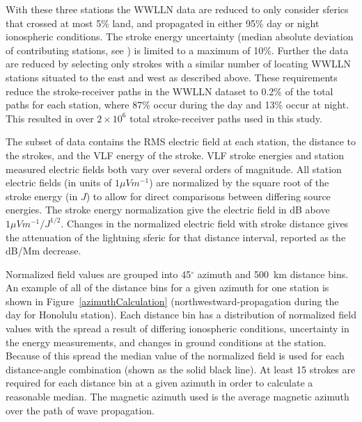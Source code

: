 With these three stations the WWLLN data are reduced to only consider sferics that crossed at most 5\% land, and propagated in either 95\% day or night ionospheric conditions.
The stroke energy uncertainty (median absolute deviation of contributing stations, see \citet{Hutchins2012}) is limited to a maximum of 10\%.
Further the data are reduced by selecting only strokes with a similar number of locating WWLLN stations situated to the east and west as described above.
These requirements reduce the stroke-receiver paths in the WWLLN dataset to 0.2\% of the total paths for each station, where 87\% occur during the day and 13\% occur at night.
This resulted in over $2\times10^6$ total stroke-receiver paths used in this study.

The subset of data contains the RMS electric field at each station, the distance to the strokes, and the VLF energy of the stroke.
VLF stroke energies and station measured electric fields both vary over several orders of magnitude.
All station electric fields (in units of $1 \mu V m^{-1}$) are normalized by the square root of the stroke energy (in $J$) to allow for direct comparisons between differing source energies.
The stroke energy normalization give the electric field in dB above $1 \mu Vm^{-1}/J^{1/2}$.
Changes in the normalized electric field with stroke distance gives the attenuation of the lightning sferic for that distance interval, reported as the dB/Mm decrease. 

Normalized field values are grouped into 45$^\circ$ azimuth and 500~km distance bins.
An example of all of the distance bins for a given azimuth for one station is shown in Figure~\ref{azimuthCalculation} (northwestward-propagation during the day for Honolulu station).
Each distance bin has a distribution of normalized field values with the spread a result of differing ionospheric conditions, uncertainty in the energy measurements, and changes in ground conditions at the station.
Because of this spread the median value of the normalized field is used for each distance-angle combination (shown as the solid black line).
At least 15 strokes are required for each distance bin at a given azimuth in order to calculate a reasonable median.
The magnetic azimuth used is the average magnetic azimuth over the path of wave propagation.

